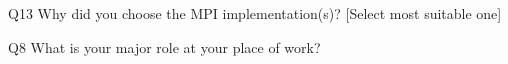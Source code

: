 \begin{description}%
\item{Q13} Why did you choose the MPI implementation(s)? [Select most suitable one]%
\item{Q8} What is your major role at your place of work?%
\end{description}%
